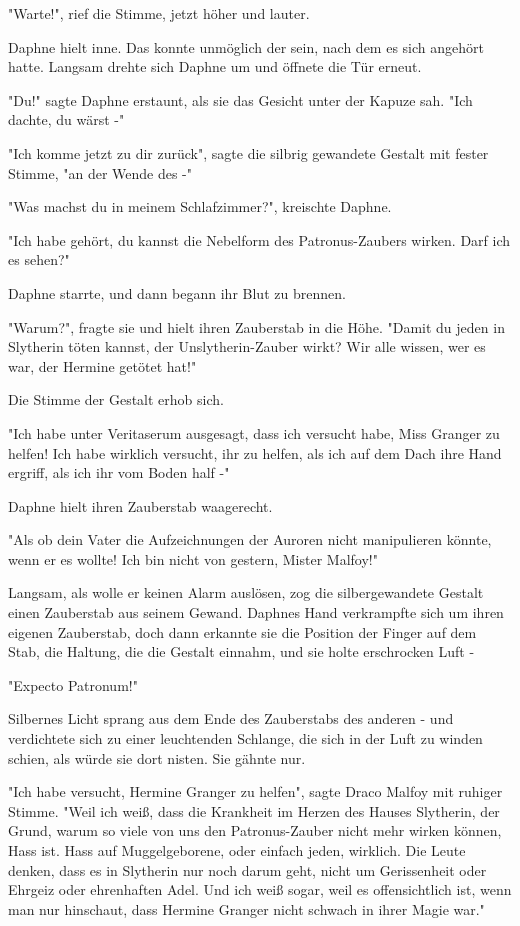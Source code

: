 {"Warte!", rief die Stimme, jetzt höher und lauter.

Daphne hielt inne. Das konnte unmöglich der sein, nach dem es sich angehört hatte. Langsam drehte sich Daphne um und öffnete die Tür erneut.

"Du!" sagte Daphne erstaunt, als sie das Gesicht unter der Kapuze sah. "Ich dachte, du wärst -"

"Ich komme jetzt zu dir zurück", sagte die silbrig gewandete Gestalt mit fester Stimme, "an der Wende des -"

"Was machst du in meinem Schlafzimmer?", kreischte Daphne.

"Ich habe gehört, du kannst die Nebelform des Patronus-Zaubers wirken. Darf ich es sehen?"

Daphne starrte, und dann begann ihr Blut zu brennen.

"Warum?", fragte sie und hielt ihren Zauberstab in die Höhe. "Damit du jeden in Slytherin töten kannst, der Unslytherin-Zauber wirkt? Wir alle wissen, wer es war, der Hermine getötet hat!"

Die Stimme der Gestalt erhob sich.

"Ich habe unter Veritaserum ausgesagt, dass ich versucht habe, Miss Granger zu helfen! Ich habe wirklich versucht, ihr zu helfen, als ich auf dem Dach ihre Hand ergriff, als ich ihr vom Boden half -"

Daphne hielt ihren Zauberstab waagerecht.

"Als ob dein Vater die Aufzeichnungen der Auroren nicht manipulieren könnte, wenn er es wollte! Ich bin nicht von gestern, Mister Malfoy!"

Langsam, als wolle er keinen Alarm auslösen, zog die silbergewandete Gestalt einen Zauberstab aus seinem Gewand. Daphnes Hand verkrampfte sich um ihren eigenen Zauberstab, doch dann erkannte sie die Position der Finger auf dem Stab, die Haltung, die die Gestalt einnahm, und sie holte erschrocken Luft -

"Expecto Patronum!"

Silbernes Licht sprang aus dem Ende des Zauberstabs des anderen - und verdichtete sich zu einer leuchtenden Schlange, die sich in der Luft zu winden schien, als würde sie dort nisten. Sie gähnte nur.

"Ich habe versucht, Hermine Granger zu helfen", sagte Draco Malfoy mit ruhiger Stimme. "Weil ich weiß, dass die Krankheit im Herzen des Hauses Slytherin, der Grund, warum so viele von uns den Patronus-Zauber nicht mehr wirken können, Hass ist. Hass auf Muggelgeborene, oder einfach jeden, wirklich. Die Leute denken, dass es in Slytherin nur noch darum geht, nicht um Gerissenheit oder Ehrgeiz oder ehrenhaften Adel. Und ich weiß sogar, weil es offensichtlich ist, wenn man nur hinschaut, dass Hermine Granger nicht schwach in ihrer Magie war."

}
